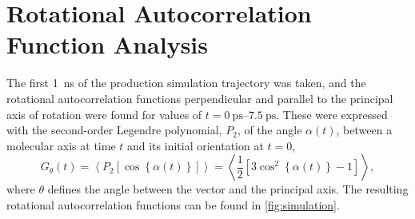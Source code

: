 \documentclass[reprint,
               superscriptaddress,
               nobibnotes,
               amsmath,
               amssymb,
               aps,
               hidelinks, 
               pre]{revtex4-2}
\begin{document}
\section{Rotational Autocorrelation Function Analysis}
\label{sec:rotational}

The first \qty{1}{\nano\second} of the production simulation trajectory was taken, and the rotational autocorrelation functions perpendicular and parallel to the principal axis of rotation were found for values of $t = \qtyrange{0}{7.5}{\pico\second}$.
These were expressed with the second-order Legendre polynomial, $P_2$, of the angle $\alpha(t)$, between a molecular axis at time $t$ and its initial orientation at $t=0$, 
%
\begin{equation}
G_{\theta}(t) = \left\langle P_2 \left[ \cos \left\{\alpha(t)\right\} \right] \right\rangle = \left\langle \frac{1}{2} \left[ 3 \cos^2 \left\{\alpha(t)\right\} -1 \right] \right\rangle,
\label{equ:rot_bes_exp}
\end{equation}
%
where $\theta$ defines the angle between the vector and the principal axis. 
The resulting rotational autocorrelation functions can be found in \cref{fig:simulation}. 
\end{document}
